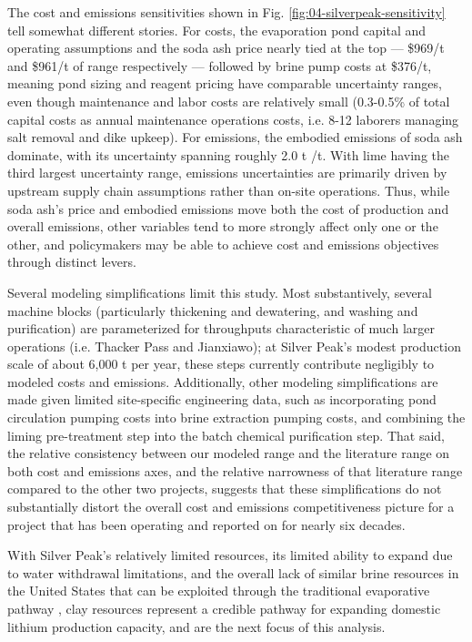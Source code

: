 \documentclass{article}
\renewcommand\_{\textunderscore\allowbreak}
\begin{document}
The cost and emissions sensitivities shown in Fig. \ref{fig:04-silverpeak-sensitivity} tell somewhat different stories. For costs, the evaporation pond capital and operating assumptions and the soda ash price nearly tied at the top --- \$969/t and \$961/t of range respectively --- followed by brine pump costs at \$376/t, meaning pond sizing and reagent pricing have comparable uncertainty ranges, even though maintenance and labor costs are relatively small (0.3-0.5\% of total capital costs as annual maintenance operations costs, i.e. 8-12 laborers managing salt removal and dike upkeep). For emissions, the embodied emissions of soda ash dominate, with its uncertainty spanning roughly 2.0 t /t. With lime having the third largest uncertainty range, emissions uncertainties are primarily driven by upstream supply chain assumptions rather than on-site operations. Thus, while soda ash's price and embodied emissions move both the cost of production and overall emissions, other variables tend to more strongly affect only one or the other, and policymakers may be able to achieve cost and emissions objectives through distinct levers. 

Several modeling simplifications limit this study. Most substantively, several machine blocks (particularly thickening and dewatering, and washing and purification) are parameterized for throughputs characteristic of much larger operations (i.e. Thacker Pass and Jianxiawo); at Silver Peak's modest production scale of about 6,000 t  per year, these steps currently contribute negligibly to modeled costs and emissions. Additionally, other modeling simplifications are made given limited site-specific engineering data, such as incorporating pond circulation pumping costs into brine extraction pumping costs, and combining the liming pre-treatment step into the batch chemical purification step. That said, the relative consistency between our modeled range and the literature range on both cost and emissions axes, and the relative narrowness of that literature range compared to the other two projects, suggests that these simplifications do not substantially distort the overall cost and emissions competitiveness picture for a project that has been operating and reported on for nearly six decades.

With Silver Peak's relatively limited resources, its limited ability to expand due to water withdrawal limitations, and the overall lack of similar brine resources in the United States that can be exploited through the traditional evaporative pathway \cite{wesselkaemperOptimizationProcessingCosts2025}, clay resources represent a credible pathway for expanding domestic lithium production capacity, and are the next focus of this analysis. 
\end{document}
